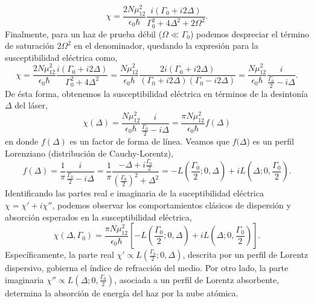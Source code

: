 \begin{equation}
\boxed{
    \chi = \frac{2 N \mu_{12}^2}{\epsilon_0 \hbar} \frac{i (\Gamma_0 + i 2 \Delta)}{\Gamma_0^2 + 4 \Delta^2 + 2 \Omega^2}.
}\end{equation}
Finalmente, para un haz de prueba débil ($\Omega \ll \Gamma_0$) podemos despreciar el término de saturación $2 \Omega^2$ en el denominador, quedando la expresión para la susceptibilidad eléctrica como,
\begin{equation}
    \chi = \frac{2 N \mu_{12}^2}{\epsilon_0 \hbar} \frac{i (\Gamma_0 + i 2 \Delta)}{\Gamma_0^2 + 4 \Delta^2} 
    = \frac{N \mu_{12}^2}{\epsilon_0 \hbar} \frac{2i (\Gamma_0 + i 2 \Delta)}{(\Gamma_0 + i 2 \Delta)(\Gamma_0 - i 2 \Delta)}
    = \frac{N \mu_{12}^2}{\epsilon_0 \hbar} \frac{i}{\frac{\Gamma_0}{2} - i\Delta}.
\end{equation}
De ésta forma, obtenemos la susceptibilidad eléctrica en términos de la desintonía $\Delta$ del láser,
\begin{equation}
\boxed{
    \chi(\Delta) = \frac{N \mu_{12}^2}{\epsilon_0 \hbar} \frac{i}{\frac{\Gamma_0}{2} - i\Delta} = \frac{\pi N \mu_{12}^2}{\epsilon_0 \hbar} f(\Delta)
}\end{equation}
en donde $f(\Delta)$ es un factor de forma de línea. Veamos que $f(\Delta$) es un perfil Lorenziano (distribución de Cauchy-Lorentz),
\begin{equation}
    f(\Delta) = \frac{1}{\pi} \frac{i}{\frac{\Gamma_0}{2} - i\Delta} = \frac{1}{\pi} \frac{-\Delta + i \frac{\Gamma_0}{2}}{(\frac{\Gamma_0}{2})^2 + \Delta^2} = -L\left(\frac{\Gamma_0}{2}; 0, \Delta\right) + i L\left(\Delta; 0, \frac{\Gamma_0}{2}\right).
\end{equation}
Identificando las partes real e imaginaria de la suceptibilidad eléctrica $\chi = \chi' + i \chi''$, podemos observar los comportamientos clásicos de dispersión y absorción esperados en la susceptibilidad eléctrica,
\begin{equation}
    \chi(\Delta, \Gamma_0) = \frac{\pi N \mu_{12}^2}{\epsilon_0 \hbar} \left[-L\left(\frac{\Gamma_0}{2}; 0, \Delta\right) + i L\left(\Delta; 0, \frac{\Gamma_0}{2}\right) \right].
\end{equation}
Específicamente, la parte real $\chi' \propto L\left(\frac{\Gamma_0}{2}; 0, \Delta\right)$, descrita por un perfil de Lorentz dispersivo, gobierna el índice de refracción del medio. Por otro lado, la parte imaginaria $\chi'' \propto L\left(\Delta; 0, \frac{\Gamma_0}{2}\right)$, asociada a un perfil de Lorentz absorbente, determina la absorción de energía del haz por la nube atómica.
 
